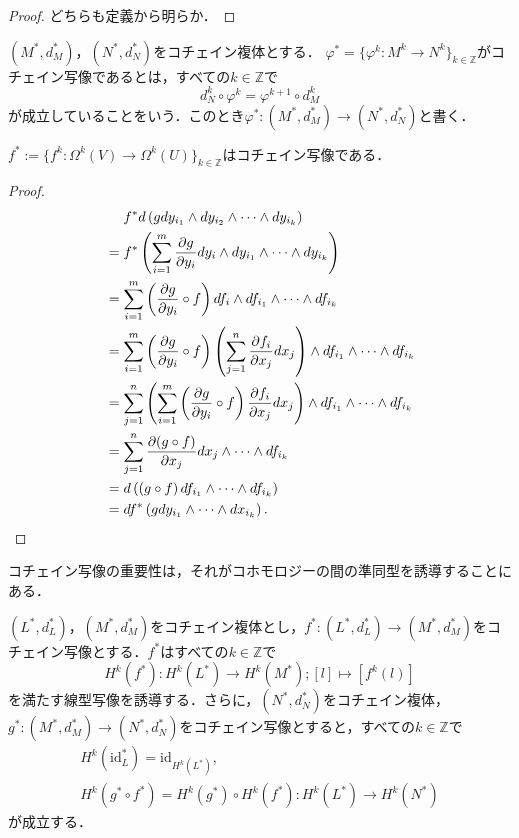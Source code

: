 \documentclass[uplatex]{jsarticle}
\begin{document}
\begin{proof}
どちらも定義から明らか．
\end{proof}
\begin{definition}
$(M^*,d^*_M)$，$(N^*,d^*_N)$をコチェイン複体とする．
$\varphi^*=\{\varphi^k\colon M^k\to N^k\}_{k\in\mathbb{Z}}$がコチェイン写像であるとは，すべての$k\in\mathbb{Z}$で
\[ d^k_N\circ \varphi^k=\varphi^{k+1}\circ d^k_M \]
が成立していることをいう．このとき$\varphi^*\colon(M^*,d^*_M)\to(N^*,d^*_N)$と書く．
\end{definition}
\begin{proposition}
$f^*:=\{f^k\colon \Omega^k(V)\to \Omega^k(U) \}_{k\in\mathbb{Z}}$はコチェイン写像である．
\end{proposition}
\begin{proof}
\begin{align*}
&\phantom{=}\mathrel{}f^*d\left(gdy_{i_1}\wedge dy_{i_2}\wedge\cdots\wedge dy_{i_k}\right) \\
&=f^*\left(\sum^m_{i=1} \frac{\partial g}{\partial y_i} dy_i\wedge dy_{i_1}\wedge\cdots\wedge dy_{i_k}\right) \\
&=\sum^m_{i=1}\left(\frac{\partial g}{\partial y_i}\circ f\right)df_i\wedge df_{i_1}\wedge\cdots\wedge df_{i_k} \\
&=\sum^m_{i=1}\left(\frac{\partial g}{\partial y_i}\circ f\right)\left(\sum^n_{j=1}\frac{\partial f_i}{\partial x_j}dx_j\right)\wedge df_{i_1}\wedge\cdots\wedge df_{i_k} \\
&=\sum^n_{j=1}\left(\sum^m_{i=1}\left(\frac{\partial g}{\partial y_i}\circ f\right)\frac{\partial f_i}{\partial x_j}dx_j\right)\wedge df_{i_1}\wedge\cdots\wedge df_{i_k} \\
&=\sum^n_{j=1}\frac{\partial(g\circ f)}{\partial x_j}dx_j\wedge\cdots\wedge df_{i_k} \\
&=d\left(\left(g\circ f\right)df_{i_1}\wedge\cdots\wedge df_{i_k}\right) \\
&=df^*\left(gdy_{i_1}\wedge\cdots\wedge dx_{i_k}\right). \qedhere
\end{align*}
\end{proof}
コチェイン写像の重要性は，それがコホモロジーの間の準同型を誘導することにある．
\begin{proposition}
$(L^*,d^*_L)$，$(M^*,d^*_M)$をコチェイン複体とし，$f^*\colon(L^*,d^*_L)\to(M^*,d^*_M)$をコチェイン写像とする．$f^*$はすべての$k\in\mathbb{Z}$で
\[ H^k(f^*)\colon H^k(L^*)\to H^k(M^*);[l]\mapsto [f^k(l)] \]
を満たす線型写像を誘導する．さらに，$(N^*,d^*_N)$をコチェイン複体，$g^*\colon (M^*,d^*_M)\to (N^*,d^*_N)$をコチェイン写像とすると，すべての$k\in\mathbb{Z}$で
\begin{gather*}
  H^k(\mathrm{id}^*_L)=\mathrm{id}_{H^k(L^*)}, \\
  H^k(g^*\circ f^*)=H^k(g^*)\circ H^k(f^*)\colon H^k(L^*)\to H^k(N^*) 
\end{gather*}
が成立する．
\end{proposition}
\end{document}
